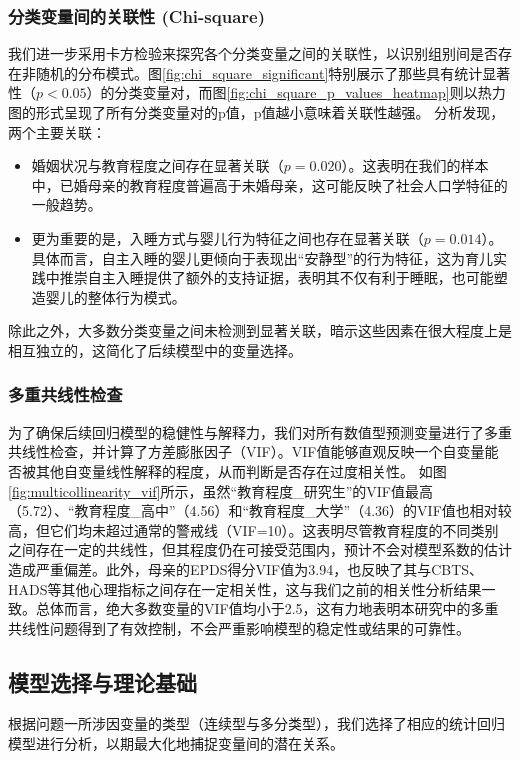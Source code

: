 \documentclass[withoutpreface,bwprint]{cumcmthesis}
\begin{document}
\subsubsection{分类变量间的关联性 (Chi-square)}
我们进一步采用卡方检验来探究各个分类变量之间的关联性，以识别组别间是否存在非随机的分布模式。图\ref{fig:chi_square_significant}特别展示了那些具有统计显著性（$p<0.05$）的分类变量对，而图\ref{fig:chi_square_p_values_heatmap}则以热力图的形式呈现了所有分类变量对的p值，p值越小意味着关联性越强。
分析发现，两个主要关联：
\begin{itemize}
    \item 婚姻状况与教育程度之间存在显著关联（$p=0.020$）。这表明在我们的样本中，已婚母亲的教育程度普遍高于未婚母亲，这可能反映了社会人口学特征的一般趋势。
    \item 更为重要的是，入睡方式与婴儿行为特征之间也存在显著关联（$p=0.014$）。具体而言，自主入睡的婴儿更倾向于表现出“安静型”的行为特征，这为育儿实践中推崇自主入睡提供了额外的支持证据，表明其不仅有利于睡眠，也可能塑造婴儿的整体行为模式。
\end{itemize}
除此之外，大多数分类变量之间未检测到显著关联，暗示这些因素在很大程度上是相互独立的，这简化了后续模型中的变量选择。

\subsubsection{多重共线性检查}
为了确保后续回归模型的稳健性与解释力，我们对所有数值型预测变量进行了多重共线性检查，并计算了方差膨胀因子（VIF）。VIF值能够直观反映一个自变量能否被其他自变量线性解释的程度，从而判断是否存在过度相关性。
如图\ref{fig:multicollinearity_vif}所示，虽然“教育程度\_研究生”的VIF值最高（5.72）、“教育程度\_高中”（4.56）和“教育程度\_大学”（4.36）的VIF值也相对较高，但它们均未超过通常的警戒线（VIF=10）。这表明尽管教育程度的不同类别之间存在一定的共线性，但其程度仍在可接受范围内，预计不会对模型系数的估计造成严重偏差。此外，母亲的EPDS得分VIF值为3.94，也反映了其与CBTS、HADS等其他心理指标之间存在一定相关性，这与我们之前的相关性分析结果一致。总体而言，绝大多数变量的VIF值均小于2.5，这有力地表明本研究中的多重共线性问题得到了有效控制，不会严重影响模型的稳定性或结果的可靠性。

\subsection{模型选择与理论基础}
根据问题一所涉因变量的类型（连续型与多分类型），我们选择了相应的统计回归模型进行分析，以期最大化地捕捉变量间的潜在关系。
\end{document}
